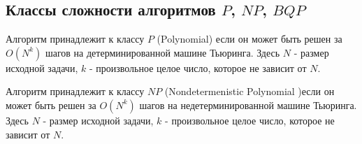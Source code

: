 \subsection{Классы сложности алгоритмов $P$, $NP$, $BQP$ }

\begin{definition}
Алгоритм принадлежит к классу $P$ (Polynomial) если он может быть решен за
 $O\left(N^k\right)$ шагов на детерминированной машине Тьюринга. 
Здесь $N$ - размер исходной задачи, $k$ - произвольное целое число,
которое не зависит от $N$. 
\end{definition}

\begin{definition}
Алгоритм принадлежит к классу $NP$ (Nondetermenistic Polynomial )если
он может быть решен за  $O\left(N^k\right)$ шагов на
недетерминированной машине Тьюринга.  Здесь $N$ - размер исходной
задачи, $k$ - произвольное целое число, которое не зависит от $N$. 
\end{definition}

